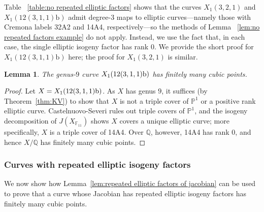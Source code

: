 \documentclass[12pt]{amsart}
\newtheorem{lem}[thm]{Lemma}
\theoremstyle{definition}
\newcommand{\bbF}{\mathbb{F}}
\numberwithin{equation}{section}
\begin{document}
Table ~\ref{table:no repeated elliptic factors} shows that the curves $X_1(3,2,1)$ and $X_1(12(3,1,1)\text{b})$ admit degree-$3$ maps to elliptic curves---namely those with Cremona labels 32A2 and 14A4, respectively---so the methods of Lemma ~\ref{lem:no repeated factors example} do not apply. Instead, we use the fact that, in each case, the single elliptic isogeny factor has rank $0$. We provide the short proof for $X_1(12(3,1,1)\text{b})$ here; the proof for $X_1(3,2,1)$ is similar.

\begin{lem}
    The genus-$9$ curve $X_1(\rm 12(3,1,1)b)$ has finitely many cubic points.
\end{lem}
\begin{proof}
    Let $X = X_1(\rm 12(3,1,1)b)$. As $X$ has genus $9$, it suffices (by Theorem~\ref{thm:KV}) to show that $X$ is not a triple cover of $\mathbb{P}^1$ or a positive rank elliptic curve. Castelnuovo-Severi rules out triple covers of $\mathbb{P}^1$, and the isogeny decomposition of $J(X_{\bbF_{11}})$ shows $X$ covers a unique elliptic curve; more specifically, $X$ is a triple cover of 14A4. Over $\mathbb{Q}$, however, 14A4 has rank 0, and hence $X/\mathbb{Q}$ has finitely many cubic points.
\end{proof}

\subsubsection{Curves with repeated elliptic isogeny factors}

We now show how Lemma~\ref{lem:repeated elliptic factors of jacobian} can be used to prove that a curve whose Jacobian has repeated elliptic isogeny factors has finitely many cubic points.
\end{document}
